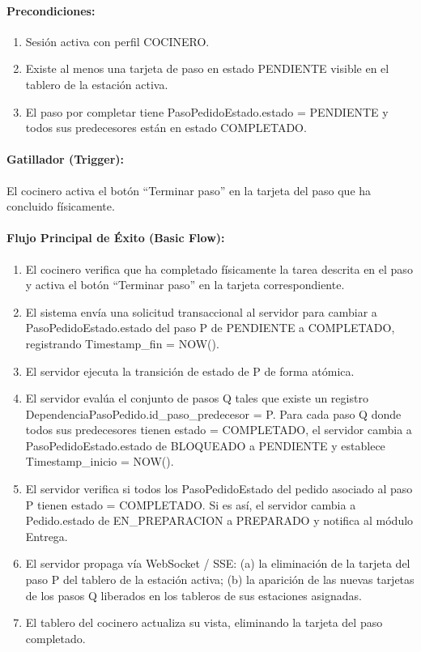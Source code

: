 \paragraph{Precondiciones:}
\begin{enumerate}
    \item[I.] Sesión activa con perfil COCINERO.
    \item[II.] Existe al menos una tarjeta de paso en estado PENDIENTE visible en el tablero de la estación activa.
    \item[III.] El paso por completar tiene PasoPedidoEstado.estado = PENDIENTE y todos sus predecesores están en estado COMPLETADO.
\end{enumerate}

\paragraph{Gatillador (Trigger):} El cocinero activa el botón ``Terminar paso'' en la tarjeta del paso que ha concluido físicamente.

\paragraph{Flujo Principal de Éxito (Basic Flow):}
\begin{enumerate}
    \item[I.] El cocinero verifica que ha completado físicamente la tarea descrita en el paso y activa el botón ``Terminar paso'' en la tarjeta correspondiente.
    \item[II.] El sistema envía una solicitud transaccional al servidor para cambiar a PasoPedidoEstado.estado del paso P de PENDIENTE a COMPLETADO, registrando Timestamp\_fin = NOW().
    \item[III.] El servidor ejecuta la transición de estado de P de forma atómica.
    \item[IV.] El servidor evalúa el conjunto de pasos Q tales que existe un registro DependenciaPasoPedido.id\_paso\_predecesor = P. Para cada paso Q donde todos sus predecesores tienen estado = COMPLETADO, el servidor cambia a PasoPedidoEstado.estado de BLOQUEADO a PENDIENTE y establece Timestamp\_inicio = NOW().
    \item[V.] El servidor verifica si todos los PasoPedidoEstado del pedido asociado al paso P tienen estado = COMPLETADO. Si es así, el servidor cambia a Pedido.estado de EN\_PREPARACION a PREPARADO y notifica al módulo Entrega.
    \item[VI.] El servidor propaga vía WebSocket / SSE: (a) la eliminación de la tarjeta del paso P del tablero de la estación activa; (b) la aparición de las nuevas tarjetas de los pasos Q liberados en los tableros de sus estaciones asignadas.
    \item[VII.] El tablero del cocinero actualiza su vista, eliminando la tarjeta del paso completado.
\end{enumerate}

